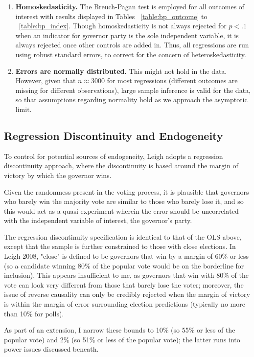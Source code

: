 \documentclass{article}
\begin{document}
\begin{enumerate}
\item \textbf{Homoskedasticity.} The Breuch-Pagan test is employed for all outcomes of interest with results displayed in Tables ~\ref{table:bp_outcome} to ~\ref{table:bp_index}. Though homoskedasticity is not always rejected for $p < .1$ when an indicator for governor party is the sole independent variable, it is always rejected once other controls are added in. Thus, all regressions are run using robust standard errors, to correct  for the concern of heteroskedasticity.

\item \textbf{Errors are normally distributed.} This might not hold in the data. However, given that $n \approx 3000$ for most regressions (different outcomes are missing for different observations), large sample inference is valid for the data, so that assumptions regarding normality hold as we approach the asymptotic limit.
\end{enumerate}


\subsection{Regression Discontinuity and Endogeneity}

To control for potential sources of endogeneity, Leigh adopts a regression discontinuity approach, where the discontinuity is based around the margin of victory by which the governor wins.

Given the randomness present in the voting process, it is plausible that governors who barely win the majority vote are similar to those who barely lose it, and so this would act as a quasi-experiment wherein the error should be uncorrelated with the independent variable of interest, the governor's party. 

The regression discontinuity specification is identical to that of the OLS above, except that the sample is further constrained to those with close elections. In Leigh 2008, "close" is defined to be governors that win by a margin of 60\% or less (so a candidate winning 80\% of the popular vote would be on the borderline for inclusion). This appears insufficient to me, as governors that win with 80\% of the vote can look very different from those that barely lose the voter; moreover, the issue of reverse causality can only be credibly rejected when the margin of victory is within the margin of error surrounding election predictions (typically no more than 10\% for polls).

As part of an extension, I narrow these bounds to 10\% (so 55\% or less of the popular vote) and 2\% (so 51\% or less of the popular vote); the latter runs into power issues discussed beneath.
\end{document}
